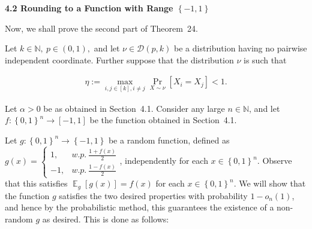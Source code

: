 \par\medskip\noindent\textbf{
4.2 Rounding to a Function with Range $\left\{-1,1\right\}$
}\par




Now, we shall prove the second part of Theorem 24.\par




Let $k\in\mathbb{N},\ p\in(0,1),$ and let $\nu\in\mathcal{D}(p,k)$ be a distribution having no pairwise independent coordinate.
Further suppose that the distribution $\nu$ is such that\par


\[\begin{gathered}
\eta:=\max_{i,j\in[k],i\not=j}\Pr_{X\sim\nu}\left[X_{i}=X_{j}\right]<1.
\end{gathered}\]


Let $\alpha>0$ be as obtained in Section 4.1.
Consider any large $n\in\mathbb{N}$, and let $f:\left\{0,1\right\}^{n}\to[-1,1]$ be the function obtained in Section 4.1.\par




Let $g:\left\{0,1\right\}^{n}\to\left\{-1,1\right\}$ be a random function, defined as $g(x)=\begin{cases}1,&w.p.\ \frac{1+f(x)}{2}\\
-1,&w.p.\ \frac{1-f(x)}{2}\end{cases}$, independently for each $x\in\left\{0,1\right\}^{n}$.
Observe that this satisfies $\mathop{\mathbb{E}}_{g}\left[g(x)\right]=f(x)$ for each $x\in\left\{0,1\right\}^{n}$.
We will show that the function $g$ satisfies the two desired properties with probability $1-o_{n}(1)$, and hence by the probabilistic method, this guarantees the existence of a non-random $g$ as desired.
This is done as follows:\par


